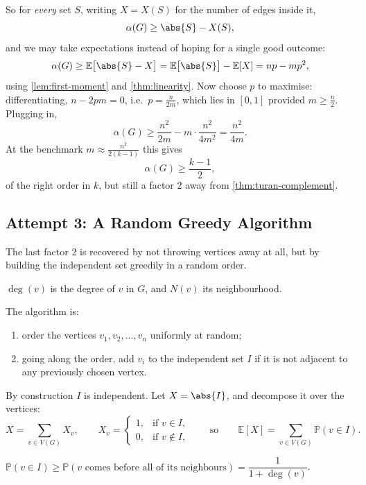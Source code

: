 So for \emph{every} set \(S\), writing \(X = X(S)\) for the number of edges inside it,
\[
    \alpha(G) \ge \abs{S} - X(S),
\]
and we may take expectations instead of hoping for a single good outcome:
\[
    \alpha(G) \ge \mathbb{E}\bigl[ \abs{S} - X \bigr] = \mathbb{E}\bigl[ \abs{S} \bigr] - \mathbb{E}[X] = np - mp^2,
\]
using \autoref{lem:first-moment} and \autoref{thm:linearity}. Now choose \(p\) to maximise: differentiating, \(n - 2pm = 0\), i.e.\ \(p = \frac{n}{2m}\), which lies in \([0,1]\) provided \(m \ge \frac{n}{2}\). Plugging in,
\[
    \alpha(G) \ge \frac{n^2}{2m} - m \cdot \frac{n^2}{4m^2} = \frac{n^2}{4m}.
\]
At the benchmark \(m \approx \frac{n^2}{2(k-1)}\) this gives
\[
    \alpha(G) \ge \frac{k-1}{2},
\]
of the right order in \(k\), but still a factor \(2\) away from \autoref{thm:turan-complement}.

\subsection{Attempt 3: A Random Greedy Algorithm}

The last factor \(2\) is recovered by not throwing vertices away at all, but by building the independent set greedily in a random order.

\begin{notation}
    \(\deg(v)\) is the degree of \(v\) in \(G\), and \(N(v)\) its neighbourhood.
\end{notation}

The algorithm is:
\begin{enumerate}[(1)]
    \item order the vertices \(v_1, v_2, \ldots, v_n\) uniformly at random;
    \item going along the order, add \(v_i\) to the independent set \(I\) if it is not adjacent to any previously chosen vertex.
\end{enumerate}
By construction \(I\) is independent. Let \(X = \abs{I}\), and decompose it over the vertices:
\[
    X = \sum_{v \in V(G)} X_v, \qquad
    X_v = \begin{cases} 1, & \text{if } v \in I, \\ 0, & \text{if } v \notin I, \end{cases}
    \qquad \text{so} \qquad
    \mathbb{E}[X] = \sum_{v \in V(G)} \mathbb{P}(v \in I).
\]

\begin{observation}\label{obs:caro-wei-prob}
    \(\mathbb{P}(v \in I) \ge \mathbb{P}(v \text{ comes before all of its neighbours}) = \dfrac{1}{1 + \deg(v)}\).
\end{observation}

